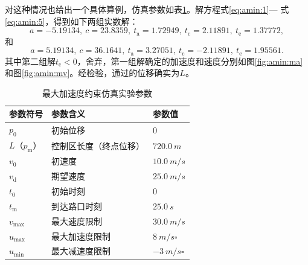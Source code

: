 对这种情况也给出一个具体算例，仿真参数如表\ref{tab:amin:param}。解方程式\eqref{eq:amin:1}--- 式\eqref{eq:amin:5}，得到如下两组实数解：
\[a = -5.19134,\ c = 23.8359,\ t_\mathrm{a} = 1.72949,\ t_\mathrm{c} = 2.11891,\ t_\mathrm{e} = 1.37772,\]
和
\[a = 5.19134,\ c = 36.1641,\ t_\mathrm{a} = 3.27051,\ t_\mathrm{c} = -2.11891,\ t_\mathrm{e} = 1.95561.\]
其中第二组解$t_\mathrm{c}<0$，舍弃，第一组解确定的加速度和速度分别如图\ref{fig:amin:ma}和图\ref{fig:amin:mv}。经检验，通过的位移确实为$L$。
\begin{table}[htbp]
\centering
\caption{最大加速度约束仿真实验参数}
\label{tab:amin:param}
\begin{tabular}{lll}
\toprule[1.5pt]
参数符号 & 参数含义 & 参数值 \\
\midrule[1pt]
$p_0$ & 初始位移 & $0$ \\
$L$（$p_\mathrm{m}$） & 控制区长度（终点位移） & $\SI{720.0}{m}$ \\
$v_0$ & 初速度 & $\SI{10.0}{m\per s}$ \\
$v_\mathrm{d}$ & 期望速度 & $\SI{25.0}{m\per s}$ \\
$t_0$ & 初始时刻 & $0$ \\
$t_\mathrm{m}$ & 到达路口时刻 & $\SI{25.0}{s}$ \\
$v_{\max}$ & 最大速度限制 & $\SI{30.0}{m\per s}$ \\
$u_{\max}$ & 最大加速度限制 & $\SI{8}{m\per s\square}$ \\
$u_{\min}$ & 最大减速度限制 & $-\SI{3}{m\per s\square}$ \\
\bottomrule[1.5pt]
\end{tabular}
\end{table}

